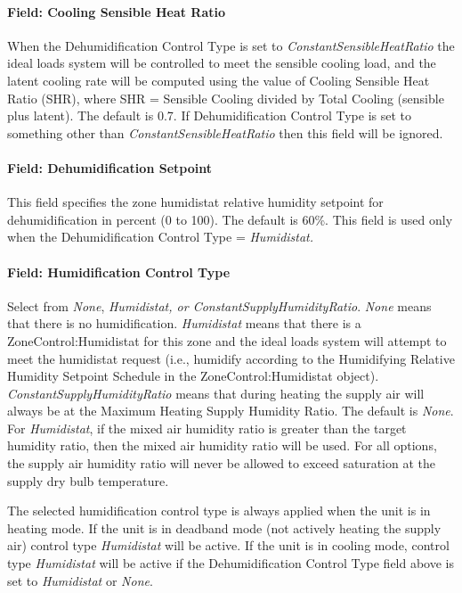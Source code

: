 \paragraph{Field: Cooling Sensible Heat Ratio}\label{field-cooling-sensible-heat-ratio}

When the Dehumidification Control Type is set to \emph{ConstantSensibleHeatRatio} the ideal loads system will be controlled to meet the sensible cooling load, and the latent cooling rate will be computed using the value of Cooling Sensible Heat Ratio (SHR), where SHR = Sensible Cooling divided by Total Cooling (sensible plus latent). The default is 0.7. If Dehumidification Control Type is set to something other than \emph{ConstantSensibleHeatRatio} then this field will be ignored.

\paragraph{Field: Dehumidification Setpoint}\label{field-dehumidification-setpoint}

This field specifies the zone humidistat relative humidity setpoint for dehumidification in percent (0 to 100). The default is 60\%. This field is used only when the Dehumidification Control Type = \emph{Humidistat.}

\paragraph{Field: Humidification Control Type}\label{field-humidification-control-type}

Select from \emph{None}, \emph{Humidistat, or ConstantSupplyHumidityRatio}. \emph{None} means that there is no humidification. \emph{Humidistat} means that there is a ZoneControl:Humidistat for this zone and the ideal loads system will attempt to meet the humidistat request (i.e., humidify according to the Humidifying Relative Humidity Setpoint Schedule in the ZoneControl:Humidistat object). \emph{ConstantSupplyHumidityRatio} means that during heating the supply air will always be at the Maximum Heating Supply Humidity Ratio. The default is \emph{None}. For \emph{Humidistat}, if the mixed air humidity ratio is greater than the target humidity ratio, then the mixed air humidity ratio will be used. For all options, the supply air humidity ratio will never be allowed to exceed saturation at the supply dry bulb temperature.

The selected humidification control type is always applied when the unit is in heating mode. If the unit is in deadband mode (not actively heating the supply air) control type \emph{Humidistat} will be active. If the unit is in cooling mode, control type \emph{Humidistat} will be active if the Dehumidification Control Type field above is set to \emph{Humidistat} or \emph{None}.

